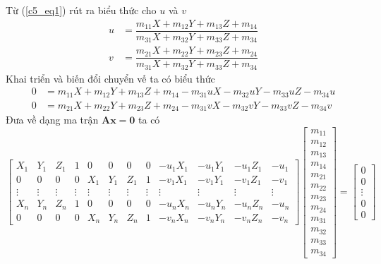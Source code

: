           \hspace*{0.6cm}Từ (\ref{c5_eq1}) rút ra biểu thức cho $u$ và $v$
          \begin{align*}
               u &= \dfrac{m_{11}X + m_{12}Y + m_{13}Z + m_{14}}{m_{31}X + m_{32}Y + m_{33}Z + m_{34}} \\
               v &= \dfrac{m_{21}X + m_{22}Y + m_{23}Z + m_{24}}{m_{31}X + m_{32}Y + m_{33}Z + m_{34}}
          \end{align*}
          Khai triển và biến đổi chuyển vế ta có biểu thức
          \begin{align}
               0 &= m_{11}X + m_{12}Y + m_{13}Z + m_{14} - m_{31}uX - m_{32}uY - m_{33}uZ - m_{34}u \\
               0 &= m_{21}X + m_{22}Y + m_{23}Z + m_{24} - m_{31}vX - m_{32}vY - m_{33}vZ - m_{34}v
          \end{align}
          Đưa về dạng ma trận $\mathbf{Ax} = \mathbf{0}$  ta có
          \begin{equation}
               \left[
               \begin{array}{cccccccccccc}
                    X_1 & Y_1 & Z_1 & 1 & 0   & 0   & 0   & 0 & -u_1X_1 & -u_1Y_1 & -u_1Z_1 & -u_1 \\
                    0   & 0   & 0   & 0 & X_1 & Y_1 & Z_1 & 1 & -v_1X_1 & -v_1Y_1 & -v_1Z_1 & -v_1 \\
                    \vdots & \vdots & \vdots & \vdots & \vdots & \vdots & \vdots & \vdots & \vdots & \vdots & \vdots & \vdots \\
                    X_n & Y_n & Z_n & 1 & 0   & 0   & 0   & 0 & -u_nX_n & -u_nY_n & -u_nZ_n & -u_n \\
                    0   & 0   & 0   & 0 & X_n & Y_n & Z_n & 1 & -v_nX_n & -v_nY_n & -v_nZ_n & -v_n
               \end{array}
               \right]
               \begin{bmatrix}
                    m_{11} \\
                    m_{12} \\
                    m_{13} \\
                    m_{14} \\
                    m_{21} \\
                    m_{22} \\
                    m_{23} \\
                    m_{24} \\
                    m_{31} \\
                    m_{32} \\
                    m_{33} \\
                    m_{34}
               \end{bmatrix}
               =
               \begin{bmatrix}
                    0 \\
                    0 \\
                    \vdots \\
                    0 \\
                    0
               \end{bmatrix}
          \end{equation}
